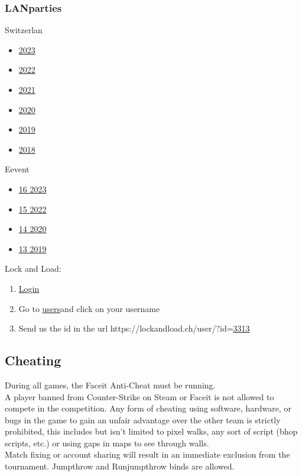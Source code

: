 \documentclass{article}
\begin{document}
\subsubsection{LANparties}
Switzerlan
\begin{itemize}
    \item \href{https://battlefy.com/switzerlan-2023/switzerlan-2023-counter-strike-2/65293e1a490b280d6f6adcb0/participants}{2023}
    \item \href{https://battlefy.com/switzerlan-2022/switzerlan-2022-csgo/634937c11ecc2379690e86f8/participants}{2022}
    \item \href{https://battlefy.com/switzerlan-2021/switzerlan-2021-csgo/613e02153a882b30a4149fc3/participants}{2021}
    \item \href{https://battlefy.com/switzerlan-2020/switzerlan-2020-csgo/5f806e118f28e0606c16e93a/participants}{2020}
    \item \href{https://battlefy.com/switzerlan-2019/csgo-5on5-main-tournament/5dd7f3c10f8e011abc0fd63f/participants}{2019}
    \item \href{https://battlefy.com/switzerlan-2018/csgo-5on5-main-tournament/5bb561bd0983dd03b26db586/participants}{2018}
\end{itemize}
Eevent
\begin{itemize}
    \item \href{https://16.eevent.ch/turnier/?do=teilnehmer&id=268}{16 2023}
    \item \href{https://15.eevent.ch/turnier/?do=teilnehmer&id=244}{15 2022}
    \item \href{https://14.eevent.ch/turnier/?do=teilnehmer&id=188}{14 2020}
    \item \href{https://13.eevent.ch/turnier/?do=teilnehmer&id=149}{13 2019}
\end{itemize}
Lock and Load:
\begin{enumerate}
 \item \href{https://lockandload.ch/user/?do=login}{Login}
 \item Go to \href{https://lockandload.ch/online/}{users}and click on your username
 \item Send us the id in the url https://lockandload.ch/user/?id=\underline{3313}
\end{enumerate}

\subsection{Cheating}
During all games, the Faceit Anti-Cheat must be running.\\
A player banned from Counter-Strike on Steam or Faceit is not allowed to compete in the competition.
Any form of cheating using software, hardware, or bugs in the game to gain an unfair advantage over the 
other team is strictly prohibited, this includes but isn't limited to pixel walks, any sort of script (bhop scripts, etc.) or
using gaps in maps to see through walls. \\
Match fixing or account sharing will result in an immediate exclusion from the tournament.
Jumpthrow and Runjumpthrow binds are allowed.
\end{document}
